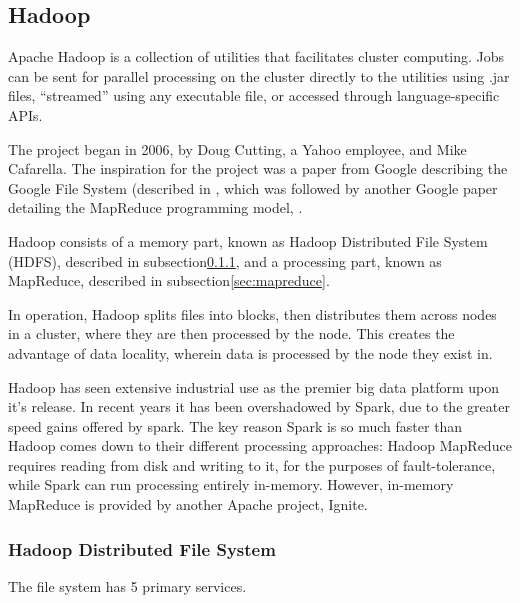 \hypertarget{sec:hadoop-1}{%
    \subsection{Hadoop}\label{sec:hadoop-1}}

Apache Hadoop is a collection of utilities that facilitates cluster
computing. Jobs can be sent for parallel processing on the cluster
directly to the utilities using .jar files, ``streamed'' using any
executable file, or accessed through language-specific APIs.

The project began in 2006, by Doug Cutting, a Yahoo employee, and Mike
Cafarella. The inspiration for the project was a paper from Google
describing the Google File System (described in
\cite{ghemawat2003google}, which was followed by another Google paper
detailing the MapReduce programming model, \cite{dean2004mapreduce}.

Hadoop consists of a memory part, known as Hadoop Distributed File
System (HDFS), described in subsection\ref{sec:hdfs},
and a processing part, known as MapReduce, described in
subsection\ref{sec:mapreduce}.

In operation, Hadoop splits files into blocks, then distributes them
across nodes in a cluster, where they are then processed by the node.
This creates the advantage of data locality, wherein data is processed
by the node they exist in.

Hadoop has seen extensive industrial use as the premier big data
platform upon it's release. In recent years it has been overshadowed by
Spark, due to the greater speed gains offered by spark. The key reason
Spark is so much faster than Hadoop comes down to their different
processing approaches: Hadoop MapReduce requires reading from disk and
writing to it, for the purposes of fault-tolerance, while Spark can run
processing entirely in-memory. However, in-memory MapReduce is provided
by another Apache project, Ignite\cite{zheludkov2017high}.

\hypertarget{sec:hdfs}{%
    \subsubsection{Hadoop Distributed File System}\label{sec:hdfs}}

The file system has 5 primary services.

